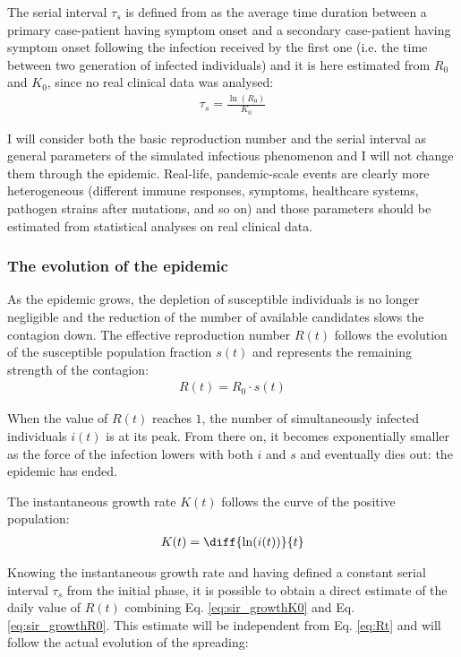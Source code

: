 \documentclass[DIV=12, BCOR=0pt]{scrartcl}  %
\begin{document}
	The serial interval $\tau_s$ is defined from \citet{Du2020} as the average time duration between a primary case-patient having symptom onset and a secondary case-patient having symptom onset following the infection received by the first one (i.e. the time between two generation of infected individuals) and it is here estimated from $R_0$ and $K_0$, since no real clinical data was analysed: 
	\begin{align}
		\tau_s = \frac{\ln(R_0)}{K_0}
		\label{eq:serial}
	\end{align}

	I will consider both the basic reproduction number and the serial interval as general parameters of the simulated infectious phenomenon and I will not change them through the epidemic. Real-life, pandemic-scale events are clearly more heterogeneous (different immune responses, symptoms, healthcare systems, pathogen strains after mutations, and so on) and those parameters should be estimated from statistical analyses on real clinical data.  

  \subsubsection{The evolution of the epidemic}
  As the epidemic grows, the depletion of susceptible individuals is no longer negligible and the reduction of the number of available candidates slows the contagion down.
  The effective reproduction number $R(t)$ follows the evolution of the susceptible population fraction $s(t)$ and represents the remaining strength of the contagion:
  \begin{align}
		R(t) = R_0 \cdot s(t) 
		\label{eq:Rt}
  \end{align}

  When the value of $R(t)$ reaches $1$, the number of simultaneously infected individuals $i(t)$ is at its peak. From there on, it becomes exponentially smaller as the force of the infection lowers with both $i$ and $s$ and eventually dies out: the epidemic has ended.
  
  The instantaneous growth rate $K(t)$ follows the curve of the positive population:
  \begin{align}
  	K(t) =  \diff{\ln(i(t))}{t}
  	\label{eq:Kt}
  \end{align}

	Knowing the instantaneous growth rate and having defined a constant serial interval $\tau_s$ from the initial phase, it is possible to obtain a direct estimate of the daily value of $R(t)$ combining Eq. \ref{eq:sir_growthK0} and Eq. \ref{eq:sir_growthR0}. This estimate will be independent from Eq. \ref{eq:Rt} and will follow the actual evolution of the spreading:
\end{document}
